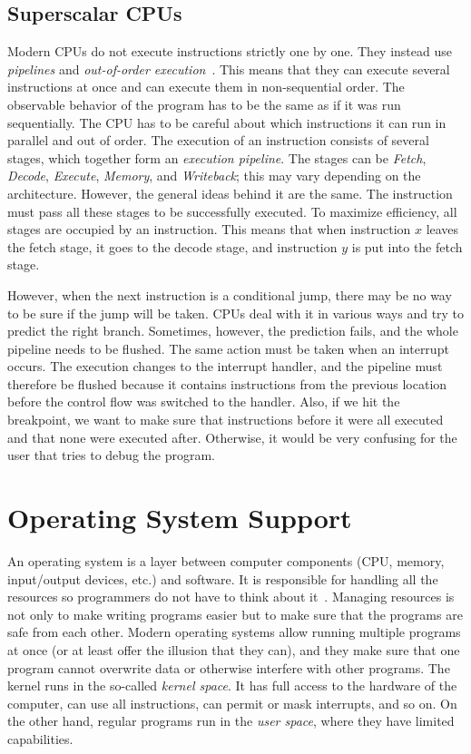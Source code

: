 \subsection{Superscalar CPUs}\label{section:superscalar-cpu}
Modern CPUs do not execute instructions strictly one by one. They instead use
\textit{pipelines} and \textit{out-of-order execution}~\cite{isa,
computer-architecture}. This means that they can execute several instructions
at once and can execute them in non-sequential order. The observable behavior
of the program has to be the same as if it was run sequentially. The CPU has to
be careful about which instructions it can run in parallel and out of order. The
execution of an instruction consists of several stages, which together form an
\textit{execution pipeline}. The stages can be \textit{Fetch}, \textit{Decode},
\textit{Execute}, \textit{Memory}, and \textit{Writeback}; this may vary
depending on the architecture. However, the general ideas behind it are the
same. The instruction must pass all these stages to be successfully executed.
To maximize efficiency, all stages are occupied by an instruction. This means
that when instruction $x$ leaves the fetch stage, it goes to the decode stage,
and instruction $y$ is put into the fetch stage.

However, when the next instruction is a conditional jump, there may be no way
to be sure if the jump will be taken. CPUs deal with it in various ways and try
to predict the right branch. Sometimes, however, the prediction fails, and the
whole pipeline needs to be flushed. The same action must be taken when an
interrupt occurs. The execution changes to the interrupt handler, and the
pipeline must therefore be flushed because it contains instructions from the
previous location before the control flow was switched to the handler. Also, if
we hit the breakpoint, we want to make sure that instructions before it were
all executed and that none were executed after. Otherwise, it would be very
confusing for the user that tries to debug the program.

\section{Operating System Support}
An operating system is a layer between computer components (CPU, memory,
input/output devices, etc.) and software. It is responsible for handling all
the resources so programmers do not have to think about it~\cite{modern-os,
os-concepts}. Managing resources is not only to make writing programs easier
but to make sure that the programs are safe from each other. Modern operating
systems allow running multiple programs at once (or at least offer the illusion
that they can), and they make sure that one program cannot overwrite data or
otherwise interfere with other programs. The kernel runs in the so-called
\textit{kernel space}. It has full access to the hardware of the computer, can
use all instructions, can permit or mask interrupts, and so on. On the other
hand, regular programs run in the \textit{user space}, where they have limited
capabilities.

